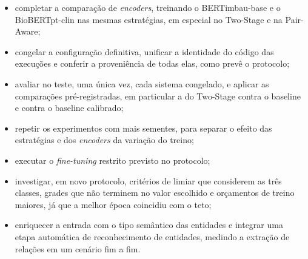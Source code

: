 \begin{itemize}
  \item completar a comparação de \emph{encoders}, treinando o BERTimbau-base e o
        BioBERTpt-clin nas mesmas estratégias, em especial no Two-Stage e na
        Pair-Aware;
  \item congelar a configuração definitiva, unificar a identidade do código das
        execuções e conferir a proveniência de todas elas, como prevê o protocolo;
  \item avaliar no teste, uma única vez, cada sistema congelado, e aplicar as
        comparações pré-registradas, em particular a do Two-Stage contra o baseline e
        contra o baseline calibrado;
  \item repetir os experimentos com mais sementes, para separar o efeito das
        estratégias e dos \emph{encoders} da variação do treino;
  \item executar o \emph{fine-tuning} restrito previsto no protocolo;
  \item investigar, em novo protocolo, critérios de limiar que considerem as três
        classes, grades que não terminem no valor escolhido e orçamentos de treino
        maiores, já que a melhor época coincidiu com o teto;
  \item enriquecer a entrada com o tipo semântico das entidades e integrar uma etapa
        automática de reconhecimento de entidades, medindo a extração de relações em
        um cenário fim a fim.
\end{itemize}
